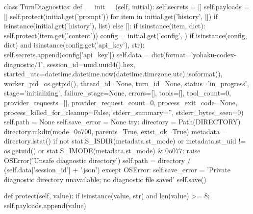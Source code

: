 class TurnDiagnostics:
    def __init__(self, initial):
        self.secrets = []
        self.payloads = []
        self.protect(initial.get('prompt'))
        for item in initial.get('history', []) if isinstance(initial.get('history'), list) else []:
            if isinstance(item, dict):
                self.protect(item.get('content'))
        config = initial.get('config', {})
        if isinstance(config, dict) and isinstance(config.get('api_key'), str):
            self.secrets.append(config['api_key'])
        self.data = dict(format='yohaku-codex-diagnostic/1', session_id=uuid.uuid4().hex,
                         started_utc=datetime.datetime.now(datetime.timezone.utc).isoformat(),
                         worker_pid=os.getpid(), thread_id=None, turn_id=None, status='in_progress',
                         stage='initializing', failure_stage=None, errors=[], tools=[], tool_count=0,
                         provider_requests=[], provider_request_count=0, process_exit_code=None,
                         process_killed_for_cleanup=False, stderr_summary='', stderr_bytes_seen=0)
        self.path = None
        self.save_error = None
        try:
            directory = Path(DIRECTORY)
            directory.mkdir(mode=0o700, parents=True, exist_ok=True)
            metadata = directory.lstat()
            if not stat.S_ISDIR(metadata.st_mode) or metadata.st_uid != os.getuid() or stat.S_IMODE(metadata.st_mode) & 0o077:
                raise OSError('Unsafe diagnostic directory')
            self.path = directory / (self.data['session_id'] + '.json')
        except OSError:
            self.save_error = 'Private diagnostic directory unavailable; no diagnostic file saved'
        self.save()

    def protect(self, value):
        if isinstance(value, str) and len(value) >= 8:
            self.payloads.append(value)

